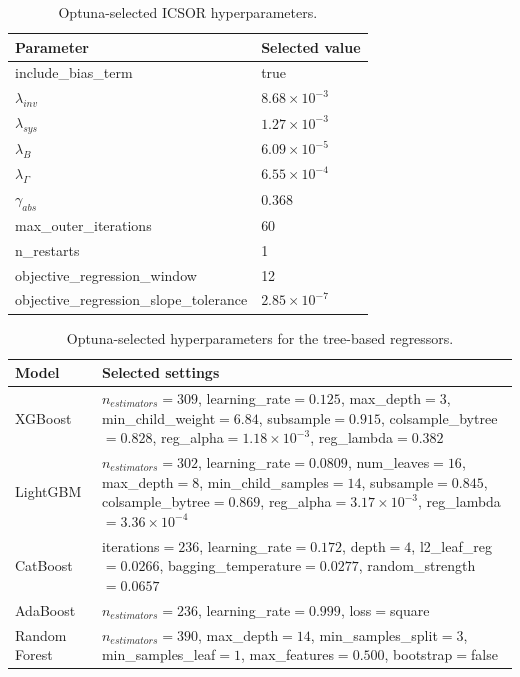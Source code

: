 \documentclass[a4paper,fleqn]{cas-sc}
\newenvironment{revblock}{}{}
\newenvironment{revblockr24}{}{}
\begin{document}
\begin{revblock}
\begin{revblockr24}
\begin{table}[H]
\centering
\caption{Optuna-selected ICSOR hyperparameters.}
\label{tab:optuna_icsor}
\scriptsize
\begin{tabular}{ll}
\hline
Parameter & Selected value \\
\hline
include\_bias\_term & true \\
$\lambda_{inv}$ & $8.68 \times 10^{-3}$ \\
$\lambda_{sys}$ & $1.27 \times 10^{-3}$ \\
$\lambda_B$ & $6.09 \times 10^{-5}$ \\
$\lambda_{\Gamma}$ & $6.55 \times 10^{-4}$ \\
$\gamma_{abs}$ & 0.368 \\
max\_outer\_iterations & 60 \\
n\_restarts & 1 \\
objective\_regression\_window & 12 \\
objective\_regression\_slope\_tolerance & $2.85 \times 10^{-7}$ \\
\hline
\end{tabular}
\end{table}

\begin{table}[H]
\centering
\caption{Optuna-selected hyperparameters for the tree-based regressors.}
\label{tab:optuna_classical_a}
\scriptsize
\begin{tabular}{>{\raggedright\arraybackslash}p{2.1cm}>{\raggedright\arraybackslash}p{9.0cm}}
\hline
Model & Selected settings \\
\hline
XGBoost & $n_{estimators}=309$, learning\_rate$=0.125$, max\_depth$=3$, min\_child\_weight$=6.84$, subsample$=0.915$, colsample\_bytree$=0.828$, reg\_alpha$=1.18 \times 10^{-3}$, reg\_lambda$=0.382$ \\
LightGBM & $n_{estimators}=302$, learning\_rate$=0.0809$, num\_leaves$=16$, max\_depth$=8$, min\_child\_samples$=14$, subsample$=0.845$, colsample\_bytree$=0.869$, reg\_alpha$=3.17 \times 10^{-3}$, reg\_lambda$=3.36 \times 10^{-4}$ \\
CatBoost & iterations$=236$, learning\_rate$=0.172$, depth$=4$, l2\_leaf\_reg$=0.0266$, bagging\_temperature$=0.0277$, random\_strength$=0.0657$ \\
AdaBoost & $n_{estimators}=236$, learning\_rate$=0.999$, loss$=$square \\
Random Forest & $n_{estimators}=390$, max\_depth$=14$, min\_samples\_split$=3$, min\_samples\_leaf$=1$, max\_features$=0.500$, bootstrap$=$false \\
\hline
\end{tabular}
\end{table}


\end{revblockr24}
\end{revblock}
\end{document}
